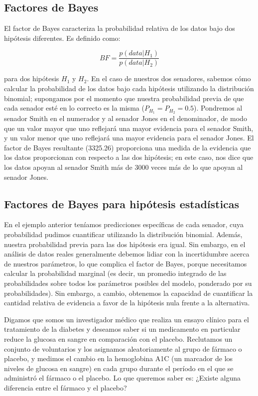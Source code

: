 \documentclass[
  12pt,
]{book}
\begin{document}
\hypertarget{Bayes-factors}{%
\subsection{Factores de Bayes}\label{Bayes-factors}}

El factor de Bayes caracteriza la probabilidad relativa de los datos bajo dos hipótesis diferentes. Es definido como:

\[
BF = \frac{p(data|H_1)}{p(data|H_2)}
\]

para dos hipótesis \(H_1\) y \(H_2\). En el caso de nuestros dos senadores, sabemos cómo calcular la probabilidad de los datos bajo cada hipótesis utilizando la distribución binomial; supongamos por el momento que nuestra probabilidad previa de que cada senador esté en lo correcto es la misma (\(P_{H_1} = P_{H_2} = 0.5\)). Pondremos al senador Smith en el numerador y al senador Jones en el denominador, de modo que un valor mayor que uno reflejará una mayor evidencia para el senador Smith, y un valor menor que uno reflejará una mayor evidencia para el senador Jones. El factor de Bayes resultante (3325.26) proporciona una medida de la evidencia que los datos proporcionan con respecto a las dos hipótesis; en este caso, nos dice que los datos apoyan al senador Smith más de 3000 veces más de lo que apoyan al senador Jones.

\hypertarget{factores-de-bayes-para-hipuxf3tesis-estaduxedsticas}{%
\subsection{Factores de Bayes para hipótesis estadísticas}\label{factores-de-bayes-para-hipuxf3tesis-estaduxedsticas}}

En el ejemplo anterior teníamos predicciones específicas de cada senador, cuya probabilidad pudimos cuantificar utilizando la distribución binomial. Además, nuestra probabilidad previa para las dos hipótesis era igual. Sin embargo, en el análisis de datos reales generalmente debemos lidiar con la incertidumbre acerca de nuestros parámetros, lo que complica el factor de Bayes, porque necesitamos calcular la probabilidad marginal (es decir, un promedio integrado de las probabilidades sobre todos los parámetros posibles del modelo, ponderado por su probabilidades). Sin embargo, a cambio, obtenemos la capacidad de cuantificar la cantidad relativa de evidencia a favor de la hipótesis nula frente a la alternativa.

Digamos que somos un investigador médico que realiza un ensayo clínico para el tratamiento de la diabetes y deseamos saber si un medicamento en particular reduce la glucosa en sangre en comparación con el placebo. Reclutamos un conjunto de voluntarios y los asignamos aleatoriamente al grupo de fármaco o placebo, y medimos el cambio en la hemoglobina A1C (un marcador de los niveles de glucosa en sangre) en cada grupo durante el período en el que se administró el fármaco o el placebo. Lo que queremos saber es: ¿Existe alguna diferencia entre el fármaco y el placebo?
\end{document}
